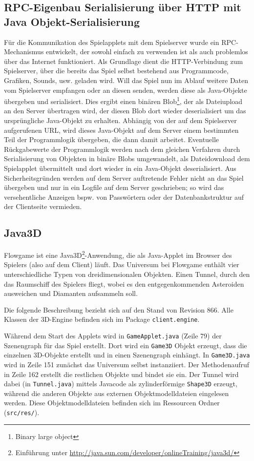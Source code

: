 \documentclass[a4paper,12pt]{scrartcl}
\begin{document}
\subsection{RPC-Eigenbau Serialisierung über HTTP mit Java
Objekt-Serialisierung}
Für die Kommunikation des Spielapplets mit dem
Spielserver wurde ein RPC-Mecha\-nismus entwickelt, der
sowohl einfach zu verwenden ist als auch problemlos über das Internet funktioniert. Als Grundlage dient die HTTP-Verbindung zum Spielserver, über die bereits
das Spiel selbst bestehend aus Programmcode, Grafiken, Sounds, usw. geladen wird.
Will das Spiel nun im Ablauf weitere Daten vom Spielserver empfangen oder an diesen
senden, werden diese als Java-Objekte übergeben und serialisiert. Dies ergibt einen binären
Blob\footnote{Binary large object}, der als Dateiupload an den Server übertragen wird, der diesen Blob dort wieder
deserialisiert um das ursprüngliche Java-Objekt zu erhalten. Abhängig von der auf dem
Spielserver aufgerufenen URL, wird dieses Java-Objekt auf dem Server einem bestimmten
Teil der Programmlogik übergeben, die dann damit arbeitet. Eventuelle
Rückgabewerte der Programmlogik werden nach dem gleichen Verfahren durch Serialisierung von Objekten
in binäre Blobs umgewandelt, als Dateidownload dem Spielapplet übermittelt und dort
wieder in ein Java-Objekt deserialisiert. Aus Sicherheitsgründen werden auf dem Server
auftretende Fehler nicht an das Spiel übergeben und nur in ein Logfile auf dem Server
geschrieben; so wird das versehentliche Anzeigen bspw. von Passwörtern oder der
Datenbankstruktur auf der Clientseite vermieden.

\subsection{Java3D}
Flowgame ist eine Java3D\footnote{Einführung unter
\url{http://java.sun.com/developer/onlineTraining/java3d/}}-Anwendung, die als
Java-Applet im Browser des Spielers (also auf dem Client) läuft. Das Universum bei Flowgame enthält vier unterschiedliche Typen von dreidimensionalen Objekten. Einen Tunnel, durch den das Raumschiff des Spielers fliegt,
wobei es den entgegenkommenden Asteroiden ausweichen und Diamanten aufsammeln
soll.

Die folgende Beschreibung bezieht sich auf den Stand von Revision 866.
Alle Klassen der 3D-Engine befinden sich im Package \texttt{client.engine}.

Während dem Start des Applets wird in \texttt{GameApplet.java} (Zeile 79) der
Szenengraph für das Spiel erstellt. Dort wird ein \texttt{Game3D} Objekt
erzeugt, dass die einzelnen 3D-Objekte erstellt und in einen Szenengraph
einhängt. In \texttt{Game3D.java} wird in Zeile 151 zunächst das Universum
selbst instanziiert. Der Methodenaufruf in Zeile 162 erstellt die restlichen Objekte und bindet sie ein. Der Tunnel wird dabei (in \texttt{Tunnel.java}) mittels
Javacode als zylinderförmige \texttt{Shape3D} erzeugt, während die anderen
Objekte aus externen Objektmodelldateien eingelesen werden. Diese Objektmodelldateien befinden sich im
Ressourcen Ordner (\texttt{src/res/}).
\end{document}
